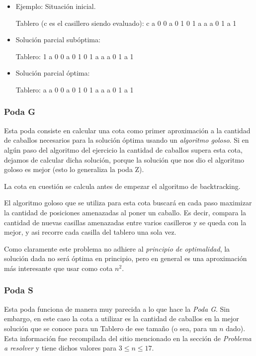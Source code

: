 \begin{itemize}
\item Ejemplo: Situación inicial.

\begin{codesnippet}
Tablero (c es el casillero siendo evaluado):
c a 0 0
a 0 1 0
1 a a a
0 1 a 1
\end{codesnippet}

\item Solución parcial subóptima:

\begin{codesnippet}
Tablero:
1 a 0 0
a 0 1 0
1 a a a
0 1 a 1
\end{codesnippet}

\item Solución parcial óptima:

\begin{codesnippet}
Tablero:
a a 0 0
a 0 1 0
1 a a a
0 1 a 1
\end{codesnippet}
\end{itemize}

\subsubsection{Poda G}
Esta poda consiste en calcular una cota como primer aproximación a la cantidad de caballos necesarios para la solución óptima usando un \textit{algoritmo goloso}. Si en algún paso del algoritmo del ejercicio la cantidad de caballos supera esta cota, dejamos de calcular dicha solución, porque la solución que nos dio el algoritmo goloso es mejor (esto lo generaliza la poda Z).

La cota en cuestión se calcula antes de empezar el algoritmo de backtracking.

El algoritmo goloso que se utiliza para esta cota buscará en cada paso maximizar la cantidad de posiciones amenazadas al poner un caballo. Es decir, compara la cantidad de nuevas casillas amenazadas entre varios casilleros y se queda con la mejor, y asi recorre cada casilla del tablero una sola vez.

Como claramente este problema no adhiere al \textit{principio de optimalidad}, la solución dada no será óptima en principio, pero en general es una aproximación más interesante que usar como cota $n^2$.

\subsubsection{Poda S}
Esta poda funciona de manera muy parecida a lo que hace la \textit{Poda G}. Sin embargo, en este caso la cota a utilizar es la cantidad de caballos en la mejor solución que se conoce para un Tablero de ese tamaño (o sea, para un $n$ dado). Esta información fue recompilada del sitio mencionado en la sección de \textit{Problema a resolver} y tiene dichos valores para $3\leq n\leq 17$.

